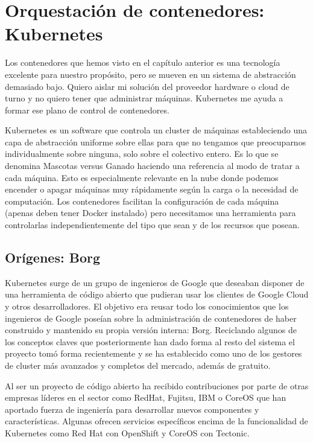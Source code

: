 \chapter{Orquestación de contenedores: Kubernetes}
\label{chap:kubernetes}

Los contenedores que hemos visto en el capítulo anterior es una tecnología excelente para nuestro propósito, pero se mueven en un sistema de abstracción demasiado bajo. Quiero aislar mi solución del proveedor hardware o cloud de turno y no quiero tener que administrar máquinas. Kubernetes me ayuda a formar ese plano de control de contenedores.

Kubernetes es un software que controla un cluster de máquinas estableciendo una capa de abstracción uniforme sobre ellas para que no tengamos que preocuparnos individualmente sobre ninguna, solo sobre el colectivo entero. Es lo que se denomina Mascotas versus Ganado\cite{noahslater2014} haciendo una referencia al modo de tratar a cada máquina. Esto es especialmente relevante en la nube donde podemos encender o apagar máquinas muy rápidamente según la carga o la necesidad de computación. Los contenedores facilitan la configuración de cada máquina (apenas deben tener Docker instalado) pero necesitamos una herramienta para controlarlas independientemente del tipo que sean y de los recursos que posean.

\section{Orígenes: Borg}
\label{sec:borg}

Kubernetes surge de un grupo de ingenieros de Google que deseaban disponer de una herramienta de código abierto que pudieran usar los clientes de Google Cloud y otros desarrolladores\cite{cademetz2015}. El objetivo era reusar todo los conocimientos que los ingenieros de Google poseían sobre la administración de contenedores de haber construido y mantenido su propia versión interna: Borg\cite{43438}. Reciclando algunos de los conceptos claves\cite{k8sborg} que posteriormente han dado forma al resto del sistema el proyecto tomó forma recientemente y se ha establecido como uno de los gestores de cluster más avanzados y completos del mercado, además de gratuito.

Al ser un proyecto de código abierto ha recibido contribuciones por parte de otras empresas líderes en el sector como RedHat, Fujitsu, IBM o CoreOS\cite{k8sanalytics} que han aportado fuerza de ingeniería para desarrollar nuevos componentes y características. Algunas ofrecen servicios específicos encima de la funcionalidad de Kubernetes como Red Hat con OpenShift\cite{openshift} y CoreOS con Tectonic\cite{tectonic}.

